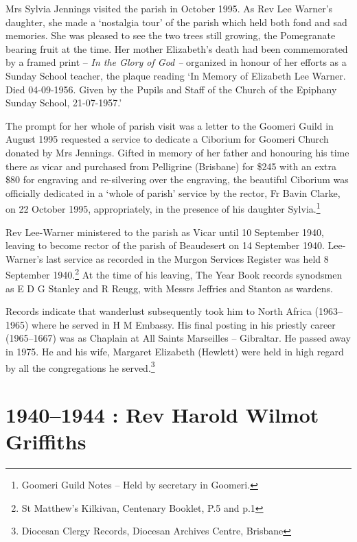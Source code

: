 Mrs Sylvia Jennings visited the parish in October 1995. As Rev Lee Warner's daughter, she made a `nostalgia tour' of the parish which held both fond and sad memories. She was pleased to see the two trees still growing, the Pomegranate bearing fruit at the time. Her mother Elizabeth's death had been commemorated by a framed print -- \emph{In the Glory of God --} organized in honour of her efforts as a Sunday School teacher, the plaque reading `In Memory of Elizabeth Lee Warner. Died 04-09-1956. Given by the Pupils and Staff of the Church of the Epiphany Sunday School, 21-07-1957.'



The prompt for her whole of parish visit was a letter to the Goomeri Guild in August 1995 requested a service to dedicate a Ciborium for Goomeri Church donated by Mrs Jennings. Gifted in memory of her father and honouring his time there as vicar and purchased from Pelligrine (Brisbane) for \$245 with an extra \$80 for engraving and re-silvering over the engraving, the beautiful Ciborium was officially dedicated in a `whole of parish' service by the rector, Fr Bavin Clarke, on 22 October 1995, appropriately, in the presence of his daughter Sylvia.\footnote{Goomeri Guild Notes -- Held by secretary in Goomeri.}


Rev Lee-Warner ministered to the parish as Vicar until 10 September 1940, leaving to become rector of the parish of Beaudesert on 14 September 1940. Lee-Warner's last service as recorded in the Murgon Services Register was held 8 September 1940.\footnote{St Matthew's Kilkivan, Centenary Booklet, P.5 and p.1} At the time of his leaving, The Year Book records synodsmen as E D G Stanley and R Reugg, with Messrs Jeffries and Stanton as wardens.


Records indicate that wanderlust subsequently took him to North Africa (1963--1965) where he served in H M Embassy. His final posting in his priestly career (1965--1667) was as Chaplain at All Saints Marseilles -- Gibraltar. He passed away in 1975. He and his wife, Margaret Elizabeth (Hewlett) were held in high regard by all the congregations he served.\footnote{Diocesan Clergy Records, Diocesan Archives Centre, Brisbane}


\balance


\printendnotes[custom]
\setcounter{endnote}{0}
\chapter{1940--1944 : Rev Harold Wilmot Griffiths}
\nobalance


